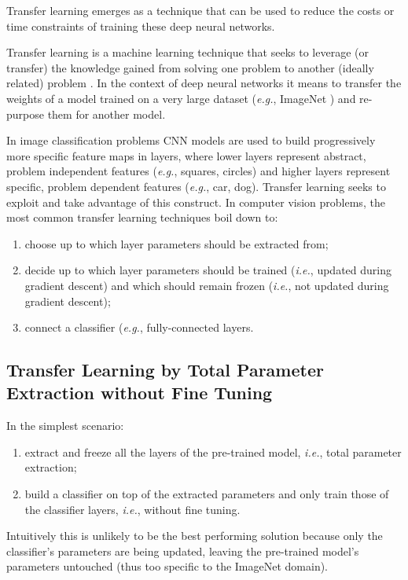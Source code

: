 Transfer learning emerges as a technique that can be used to reduce the costs or time constraints of training these deep neural networks.

Transfer learning is a machine learning technique that seeks to leverage (or transfer) the knowledge gained from solving one problem to another (ideally related) problem \cite{deeptransferlearning}. In the context of deep neural networks it means to transfer the weights of a model trained on a very large dataset (\textit{e.g.}, ImageNet \cite{imagenet}) and re-purpose them for another model.

In image classification problems \ac{CNN} models are used to build progressively more specific feature maps in layers, where lower layers represent abstract, problem independent features (\textit{e.g.}, squares, circles) and higher layers represent specific, problem dependent features (\textit{e.g.}, car, dog). Transfer learning seeks to exploit and take advantage of this construct. In computer vision problems, the most common transfer learning techniques boil down to:

\begin{enumerate}
    \item choose up to which layer parameters should be extracted from;
    \item decide up to which layer parameters should be trained (\textit{i.e.}, updated during gradient descent) and which should remain frozen (\textit{i.e.}, not updated during gradient descent);
    \item connect a classifier (\textit{e.g.}, fully-connected layers.
\end{enumerate}

\subsection{Transfer Learning by Total Parameter Extraction without Fine Tuning}

In the simplest scenario:

\begin{enumerate}
    \item extract and freeze all the layers of the pre-trained model, \textit{i.e.}, total parameter extraction;
    \item build a classifier on top of the extracted parameters and only train those of the classifier layers, \textit{i.e.}, without fine tuning.
\end{enumerate}

Intuitively this is unlikely to be the best performing solution because only the classifier's parameters are being updated, leaving the pre-trained model's parameters untouched (thus too specific to the ImageNet domain).


